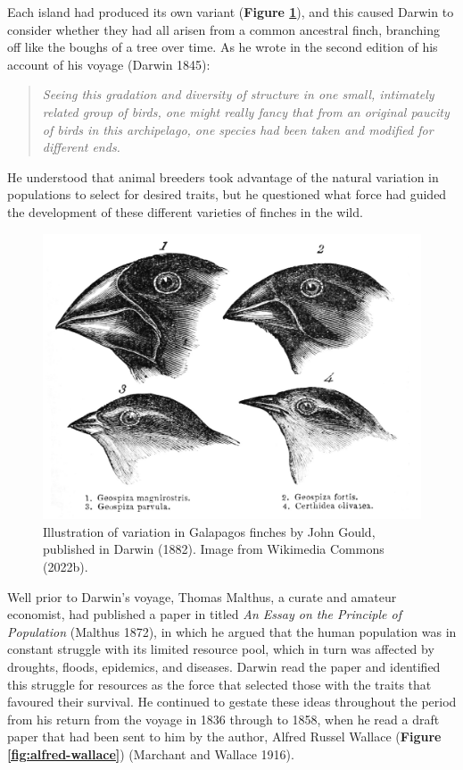 \documentclass[
]{book}
\begin{document}
Each island had produced its own variant (\textbf{Figure \ref{fig:darwin-finches}}), and this caused Darwin to consider whether they had all arisen from a common ancestral finch, branching off like the boughs of a tree over time. As he wrote in the second edition of his account of his voyage (Darwin 1845):

\begin{quote}
\emph{Seeing this gradation and diversity of structure in one small, intimately related group of birds, one might really fancy that from an original paucity of birds in this archipelago, one species had been taken and modified for different ends.}
\end{quote}

He understood that animal breeders took advantage of the natural variation in populations to select for desired traits, but he questioned what force had guided the development of these different varieties of finches in the wild.



\begin{figure}

{\centering \includegraphics[width=1\linewidth]{figs/introduction/Darwin's_finches_by_Gould} 

}

\caption{Illustration of variation in Galapagos finches by John Gould, published in Darwin (1882). Image from Wikimedia Commons (2022b).}\label{fig:darwin-finches}
\end{figure}

Well prior to Darwin's voyage, Thomas Malthus, a curate and amateur economist, had published a paper in titled \emph{An Essay on the Principle of Population} (Malthus 1872), in which he argued that the human population was in constant struggle with its limited resource pool, which in turn was affected by droughts, floods, epidemics, and diseases. Darwin read the paper and identified this struggle for resources as the force that selected those with the traits that favoured their survival. He continued to gestate these ideas throughout the period from his return from the voyage in 1836 through to 1858, when he read a draft paper that had been sent to him by the author, Alfred Russel Wallace (\textbf{Figure \ref{fig:alfred-wallace}}) (Marchant and Wallace 1916).
\end{document}
